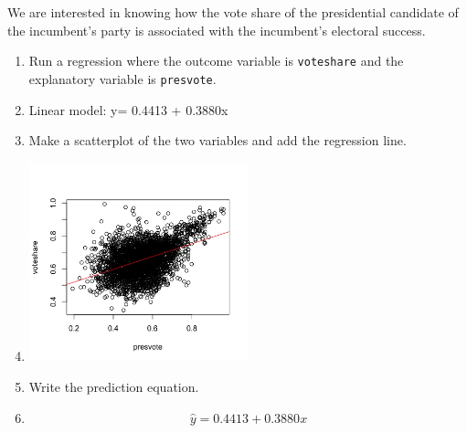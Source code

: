 \documentclass[12pt,letterpaper]{article}
\begin{document}
\noindent We are interested in knowing how the vote share of the presidential candidate of the incumbent's party is associated with the incumbent's electoral success.
	\vspace{.25cm}
	\begin{enumerate}
		\item Run a regression where the outcome variable is \texttt{voteshare} and the explanatory variable is \texttt{presvote}.
			\vspace{0.25cm}
			\item[] Linear model: y= 0.4413 + 0.3880x
			
		\item Make a scatterplot of the two variables and add the regression line. 
			\item[]
			\includegraphics[width=0.5\textwidth]{Q3.png}
			
		\item Write the prediction equation.
		\item[] $$\hat{y} = 0.4413 + 0.3880x$$
	\end{enumerate}
	

\newpage	
\end{document}
